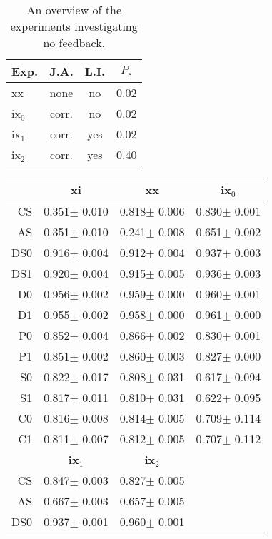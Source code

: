 \begin{table}
\centering
\begin{tabular}{||l|c|c|c||}
\hline\hline
Exp. & J.A. & L.I. & $P_s$\\\hline
xx & none & no & 0.02\\\hline
ix$_0$ & corr. & no & 0.02\\\hline
ix$_1$ & corr. & yes & 0.02\\\hline
ix$_2$ & corr. & yes & 0.40\\\hline
\hline
\end{tabular}
\caption{An overview of the experiments investigating no feedback.}
\label{t:feed:comb1}
\end{table}

\begin{table}
\centering
\begin{tabular}{||r|c|c|c||}
\hline\hline
&	{\bf xi}	&	{\bf xx}	&	{\bf ix$_0$}\\\hline
CS&	0.351$\pm$	0.010&	0.818$\pm$	0.006&	0.830$\pm$	0.001\\\hline
AS&	0.351$\pm$	0.010&	0.241$\pm$	0.008&	0.651$\pm$	0.002\\\hline
DS0&	0.916$\pm$	0.004&	0.912$\pm$	0.004&	0.937$\pm$	0.003\\\hline
DS1&	0.920$\pm$	0.004&	0.915$\pm$	0.005&	0.936$\pm$	0.003\\\hline
D0&	0.956$\pm$	0.002&	0.959$\pm$	0.000&	0.960$\pm$	0.001\\\hline
D1&	0.955$\pm$	0.002&	0.958$\pm$	0.000&	0.961$\pm$	0.000\\\hline
P0&	0.852$\pm$	0.004&	0.866$\pm$	0.002&	0.830$\pm$	0.001\\\hline
P1&	0.851$\pm$	0.002&	0.860$\pm$	0.003&	0.827$\pm$	0.000\\\hline
S0&	0.822$\pm$	0.017&	0.808$\pm$	0.031&	0.617$\pm$	0.094\\\hline
S1&	0.817$\pm$	0.011&	0.810$\pm$	0.031&	0.622$\pm$	0.095\\\hline
C0&	0.816$\pm$	0.008&	0.814$\pm$	0.005&	0.709$\pm$	0.114\\\hline
C1&	0.811$\pm$	0.007&	0.812$\pm$	0.005&	0.707$\pm$	0.112\\\hline
\hline\hline	\hline					
&	{\bf ix$_1$}	&	{\bf ix$_2$}&	\\\hline		
CS&	0.847$\pm$	0.003&	0.827$\pm$	0.005&	\\\hline
AS&	0.667$\pm$	0.003&	0.657$\pm$	0.005&	\\\hline
DS0&	0.937$\pm$	0.001&	0.960$\pm$	0.001&	\\\hline

\end{tabular}
\end{table}
